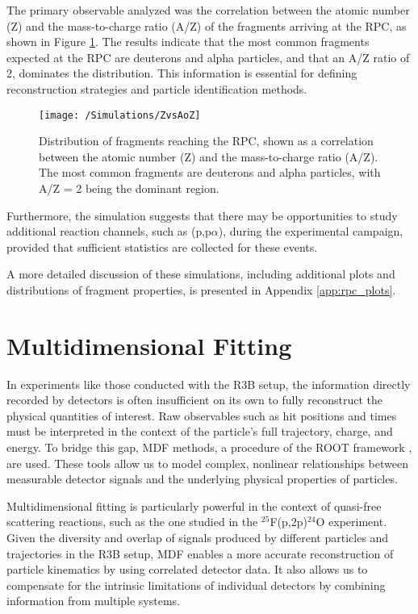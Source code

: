 The primary observable analyzed was the correlation between the atomic number (Z) and the mass-to-charge ratio (A/Z) of the fragments arriving at the \gls{RPC}, as shown in Figure \ref{fig:ZvsAoZ}. The results indicate that the most common fragments expected at the \gls{RPC} are deuterons and alpha particles, and that an A/Z ratio of 2, dominates the distribution. This information is essential for defining reconstruction strategies and particle identification methods.

\begin{figure}
	\centering
	\texttt{[image: /Simulations/ZvsAoZ]}
	\caption[Fragment distribution reaching the RPC ($Z$ vs. $A/Z$)]{Distribution of fragments reaching the \gls{RPC}, shown as a correlation between the atomic number (Z) and the mass-to-charge ratio (A/Z). The most common fragments are deuterons and alpha particles, with A/Z = 2 being the dominant region.}
	\label{fig:ZvsAoZ}
\end{figure}

Furthermore, the simulation suggests that there may be opportunities to study additional reaction channels, such as (p,p$\alpha$), during the experimental campaign, provided that sufficient statistics are collected for these events.

A more detailed discussion of these simulations, including additional plots and distributions of fragment properties, is presented in Appendix \ref{app:rpc_plots}.

\section{Multidimensional Fitting}

In experiments like those conducted with the \gls{R3B} setup, the information directly recorded by detectors is often insufficient on its own to fully reconstruct the physical quantities of interest. Raw observables such as hit positions and times must be interpreted in the context of the particle’s full trajectory, charge, and energy. To bridge this gap, \gls{MDF} methods, a procedure of the ROOT framework \cite{ROOTMDF}, are used. These tools allow us to model complex, nonlinear relationships between measurable detector signals and the underlying physical properties of particles.

Multidimensional fitting is particularly powerful in the context of quasi-free scattering reactions, such as the one studied in the $^{25}$F(p,2p)$^{24}$O experiment. Given the diversity and overlap of signals produced by different particles and trajectories in the \gls{R3B} setup, \gls{MDF} enables a more accurate reconstruction of particle kinematics by using correlated detector data. It also allows us to compensate for the intrinsic limitations of individual detectors by combining information from multiple systems.

